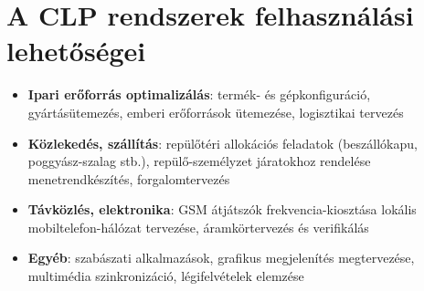
\section{A CLP rendszerek felhasználási lehetőségei}

\begin{itemize}
\item {\bf Ipari erőforrás optimalizálás}: termék- és gépkonfiguráció,
gyártásütemezés, emberi erőforrások ütemezése, logisztikai tervezés

\item {\bf Közlekedés, szállítás}: repülőtéri allokációs feladatok
(beszállókapu, poggyász-szalag stb.), repülő-személyzet járatokhoz rendelése
menetrendkészítés, forgalomtervezés

\item {\bf Távközlés, elektronika}: GSM átjátszók frekvencia-kiosztása
lokális mobiltelefon-hálózat tervezése, áramkörtervezés és verifikálás

\item {\bf Egyéb}: szabászati alkalmazások, grafikus megjelenítés megtervezése,
multimédia szinkronizáció, légifelvételek elemzése
\end{itemize}
